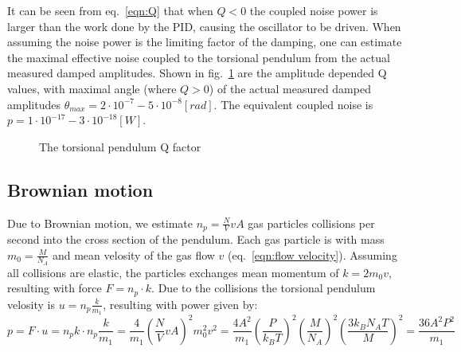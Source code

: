 \documentclass[\main/master.tex]{subfiles}
\begin{document}
It can be seen from eq.~\ref{eqn:Q} that when $Q<0$ the coupled noise power is larger than the work done by the PID, causing the oscillator to be driven. When assuming the noise power is the limiting factor of the damping, one can estimate the maximal effective noise coupled to the torsional pendulum from the actual measured damped amplitudes. Shown in fig.~\ref{fig:Q factor} are the amplitude depended Q values, with maximal angle (where $Q>0$) of the actual measured damped amplitudes $\theta_{max}= 2\cdot 10^{-7} - 5\cdot 10^{-8} [rad]$. The equivalent coupled noise is  $p= 1\cdot 10^{-17} - 3\cdot 10^{-18} [W]$.

\begin{figure}[htbp]
	\centering
	\caption[The torsional pendulum Q factor]{The torsional pendulum Q factor}
	\label{fig:Q factor}
\end{figure} 

\subsection{Brownian motion}
Due to Brownian motion, we estimate $n_p= \frac{N}{V}v A$ gas particles collisions per second into the cross section of the pendulum. Each gas particle is with mass $m_0 = \frac{M}{N_A}$ and mean velosity of the gas flow $v$ (eq.~\ref{eqn:flow velocity}). Assuming all collisions are elastic, the particles exchanges mean momentum of $k=2m_0v$, resulting with force $F = n_p\cdot k$. Due to the collisions the torsional pendulum velosity is $ u = n_p\frac{k}{m_1}$, resulting with power given by:
\begin{equation}
p = F\cdot u =  n_p k \cdot n_p\frac{k}{m_1} =\frac{4}{m_1}(\frac{N}{V}v A)^2m_0^2v^2=\frac{4A^2}{m_1}(\frac{P}{k_B T})^2(\frac{M}{N_A})^2 (\frac{3 k_B N_A T}{M})^2 =\frac{36A^2P^2}{m_1} 
\label{eqn:Brownian power}
\end{equation}
\end{document}
